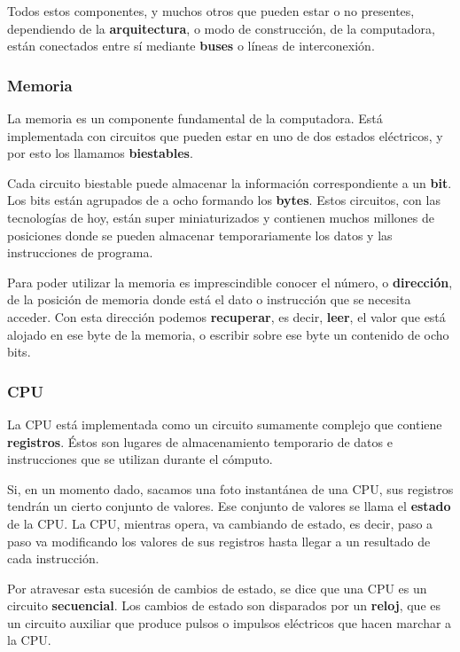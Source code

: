 \documentclass[spanish,A4,]{article}
\begin{document}
Todos estos componentes, y muchos otros que pueden estar o no presentes,
dependiendo de la \textbf{arquitectura}, o modo de construcción, de la
computadora, están conectados entre sí mediante \textbf{buses} o líneas
de interconexión.

\subsubsection{Memoria}\label{memoria}

La memoria es un componente fundamental de la computadora. Está
implementada con circuitos que pueden estar en uno de dos estados
eléctricos, y por esto los llamamos \textbf{biestables}.

Cada circuito biestable puede almacenar la información correspondiente a
un \textbf{bit}. Los bits están agrupados de a ocho formando los
\textbf{bytes}. Estos circuitos, con las tecnologías de hoy, están super
miniaturizados y contienen muchos millones de posiciones donde se pueden
almacenar temporariamente los datos y las instrucciones de programa.

Para poder utilizar la memoria es imprescindible conocer el número, o
\textbf{dirección}, de la posición de memoria donde está el dato o
instrucción que se necesita acceder. Con esta dirección podemos
\textbf{recuperar}, es decir, \textbf{leer}, el valor que está alojado
en ese byte de la memoria, o escribir sobre ese byte un contenido de
ocho bits.

\subsubsection{CPU}\label{cpu}

La CPU está implementada como un circuito sumamente complejo que
contiene \textbf{registros}. Éstos son lugares de almacenamiento
temporario de datos e instrucciones que se utilizan durante el cómputo.

Si, en un momento dado, sacamos una foto instantánea de una CPU, sus
registros tendrán un cierto conjunto de valores. Ese conjunto de valores
se llama el \textbf{estado} de la CPU. La CPU, mientras opera, va
cambiando de estado, es decir, paso a paso va modificando los valores de
sus registros hasta llegar a un resultado de cada instrucción.

Por atravesar esta sucesión de cambios de estado, se dice que una CPU es
un circuito \textbf{secuencial}. Los cambios de estado son disparados
por un \textbf{reloj}, que es un circuito auxiliar que produce pulsos o
impulsos eléctricos que hacen marchar a la CPU.
\end{document}
